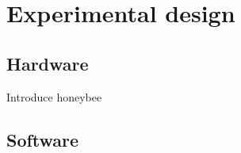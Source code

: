 \graphicspath{{exp_design/fig/}}
{

\chapter{Experimental design}
\label{chap:exp_design}

    \section{Hardware}

    Introduce honeybee
    
    \section{Software}

}
